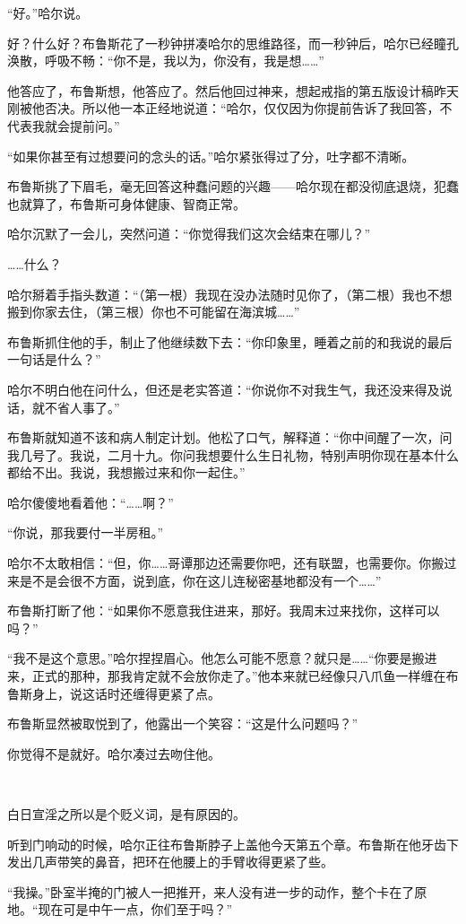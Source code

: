 \documentclass[../main]{subfiles}
\begin{document}
“好。”哈尔说。

好？什么好？布鲁斯花了一秒钟拼凑哈尔的思维路径，而一秒钟后，哈尔已经瞳孔涣散，呼吸不畅：“你不是，我以为，你没有，我是想……”

他答应了，布鲁斯想，他答应了。然后他回过神来，想起戒指的第五版设计稿昨天刚被他否决。所以他一本正经地说道：“哈尔，仅仅因为你提前告诉了我回答，不代表我就会提前问。”

“如果你甚至有过想要问的念头的话。”哈尔紧张得过了分，吐字都不清晰。

布鲁斯挑了下眉毛，毫无回答这种蠢问题的兴趣——哈尔现在都没彻底退烧，犯蠢也就算了，布鲁斯可身体健康、智商正常。

哈尔沉默了一会儿，突然问道：“你觉得我们这次会结束在哪儿？”

……什么？

哈尔掰着手指头数道：“（第一根）我现在没办法随时见你了，（第二根）我也不想搬到你家去住，（第三根）你也不可能留在海滨城……”

布鲁斯抓住他的手，制止了他继续数下去：“你印象里，睡着之前的和我说的最后一句话是什么？”

哈尔不明白他在问什么，但还是老实答道：“你说你不对我生气，我还没来得及说话，就不省人事了。”

布鲁斯就知道不该和病人制定计划。他松了口气，解释道：“你中间醒了一次，问我几号了。我说，二月十九。你问我想要什么生日礼物，特别声明你现在基本什么都给不出。我说，我想搬过来和你一起住。”

哈尔傻傻地看着他：“……啊？”

“你说，那我要付一半房租。”

哈尔不太敢相信：“但，你……哥谭那边还需要你吧，还有联盟，也需要你。你搬过来是不是会很不方面，说到底，你在这儿连秘密基地都没有一个……”

布鲁斯打断了他：“如果你不愿意我住进来，那好。我周末过来找你，这样可以吗？”

“我不是这个意思。”哈尔捏捏眉心。他怎么可能不愿意？就只是……“你要是搬进来，正式的那种，那我肯定就不会放你走了。”他本来就已经像只八爪鱼一样缠在布鲁斯身上，说这话时还缠得更紧了点。

布鲁斯显然被取悦到了，他露出一个笑容：“这是什么问题吗？”

你觉得不是就好。哈尔凑过去吻住他。

~\

白日宣淫之所以是个贬义词，是有原因的。

听到门响动的时候，哈尔正往布鲁斯脖子上盖他今天第五个章。布鲁斯在他牙齿下发出几声带笑的鼻音，把环在他腰上的手臂收得更紧了些。

“我操。”卧室半掩的门被人一把推开，来人没有进一步的动作，整个卡在了原地。“现在可是中午一点，你们至于吗？”
\end{document}
